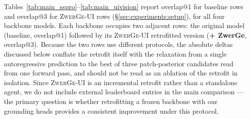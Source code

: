 
\begin{table}[t]
\centering
\caption{
  \textbf{UI-Vision.} Baseline: overlap@1. \textbf{+ ZwerGe}: overlap@3.
  Avg is the weighted average over all 5{,}790 samples (Basic 1772 + Functional 1772 + Spatial 1935 + Layout 311).
}
\label{tab:main_uivision}
\small
{}
\end{table}

Tables~\ref{tab:main_sspro}–\ref{tab:main_uivision} report overlap@1 for baseline rows and overlap@3 for \textsc{ZwerGe-UI} rows (\S\ref{sec:experiments:setup}), for all four backbone models.
Each backbone occupies two adjacent rows: the original model (baseline, overlap@1) followed by its \textsc{ZwerGe-UI} retrofitted version (\textbf{+ ZwerGe}, overlap@3).
Because the two rows use different protocols, the absolute deltas discussed below conflate the retrofit itself with the relaxation from a single autoregressive prediction to the best of three patch-posterior candidates read from one forward pass, and should not be read as an ablation of the retrofit in isolation.
Since \textsc{ZwerGe-UI} is an incremental retrofit rather than a standalone agent, we do not include external leaderboard entries in the main comparison — the primary question is whether retrofitting a frozen backbone with our grounding heads provides a consistent improvement under this protocol.

